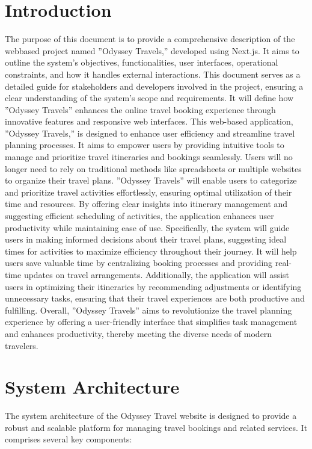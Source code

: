 \documentclass{scrreprt}
\begin{document}
\chapter{Introduction}
The purpose of this document is to provide a comprehensive description of the webbased project named ”Odyssey Travels,” developed using Next.js. It aims to outline the
system’s objectives, functionalities, user interfaces, operational constraints, and how it
handles external interactions. This document serves as a detailed guide for stakeholders
and developers involved in the project, ensuring a clear understanding of the system’s
scope and requirements. It will define how ”Odyssey Travels” enhances the online travel
booking experience through innovative features and responsive web interfaces.
This web-based application, ”Odyssey Travels,” is designed to enhance user efficiency
and streamline travel planning processes. It aims to empower users by providing intuitive tools to manage and prioritize travel itineraries and bookings seamlessly. Users
will no longer need to rely on traditional methods like spreadsheets or multiple websites to organize their travel plans. ”Odyssey Travels” will enable users to categorize
and prioritize travel activities effortlessly, ensuring optimal utilization of their time and
resources. By offering clear insights into itinerary management and suggesting efficient
scheduling of activities, the application enhances user productivity while maintaining
ease of use. Specifically, the system will guide users in making informed decisions about
their travel plans, suggesting ideal times for activities to maximize efficiency throughout
their journey. It will help users save valuable time by centralizing booking processes
and providing real-time updates on travel arrangements. Additionally, the application
will assist users in optimizing their itineraries by recommending adjustments or identifying unnecessary tasks, ensuring that their travel experiences are both productive and
fulfilling. Overall, ”Odyssey Travels” aims to revolutionize the travel planning experience by offering a user-friendly interface that simplifies task management and enhances
productivity, thereby meeting the diverse needs of modern travelers.


\chapter{System Architecture}
The system architecture of the Odyssey Travel website is designed to provide a robust and scalable platform for managing travel bookings and related services. It comprises several key components:
\end{document}
